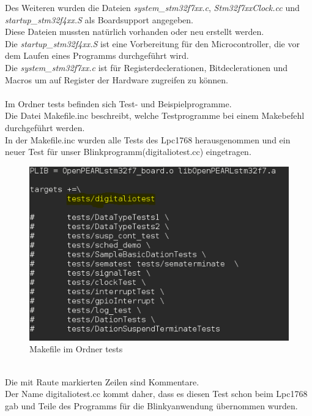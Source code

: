 \noindent
Des Weiteren wurden die Dateien {\textit{system\_stm32f7xx.c}}, {\textit{Stm32f7xxClock.cc}} und {\textit{startup\_stm32f4xx.S}} als Boardsupport angegeben.\\
Diese Dateien mussten natürlich vorhanden oder neu erstellt werden.\\
Die {\textit{startup\_stm32f4xx.S}} ist eine Vorbereitung für den Microcontroller, die vor dem Laufen eines Programms durchgeführt wird.\\ 
Die {\textit{system\_stm32f7xx.c}} ist für Registerdeclerationen, Bitdeclerationen und Macros um auf Register der Hardware zugreifen zu können.\\
\\
\newpage
\noindent
Im Ordner tests befinden sich Test- und Beispielprogramme.\\
Die Datei Makefile.inc beschreibt, welche Testprogramme bei einem Makebefehl durchgeführt werden.\\
In der Makefile.inc wurden alle Tests des Lpc1768 herausgenommen und ein neuer Test für unser Blinkprogramm(digitaliotest.cc) eingetragen.\\
\begin{figure}[h]
\begin{center}
\includegraphics[width=12cm]{grafiken/Makefile_tests.png}
\caption{Makefile im Ordner tests}
\label{Makefile_tests}
\end{center}
\end{figure}
\\
Die mit Raute markierten Zeilen sind Kommentare.\\
Der Name digitaliotest.cc kommt daher, dass es diesen Test schon beim Lpc1768 gab und Teile des Programms für die Blinkyanwendung übernommen wurden.\\
\\

